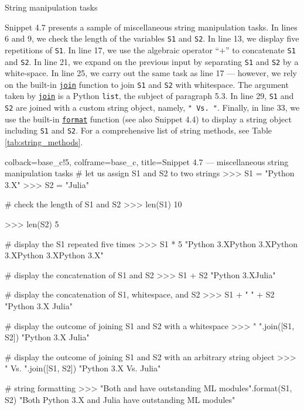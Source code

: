\documentclass[a4paper,11pt]{book}
\numberwithin{figure}{chapter}
\numberwithin{table}{chapter}
\newcommand{\question}[1]{%
    \begin{tcolorbox}[colback=comp_c!10,colframe=comp_c,sidebyside align=top,width=\linewidth,before skip=1ex]
        #1
    \end{tcolorbox}%
    \switchcolumn%
}
\newcommand{\note}[1]{%
    \begin{tcolorbox}[colback=white!0,colframe=white!10,width=\linewidth,before skip=1ex]
        #1
    \end{tcolorbox}         
}
\begin{document}
\begin{paracol}{2}
	\question{\raggedright String manipulation tasks}
		\note{Snippet 4.7 presents a sample of miscellaneous string manipulation tasks. In lines 6 and 9, we check the length of the variables \texttt{S1} and \texttt{S2}. In line 13, we display five repetitions of \texttt{S1}. In line 17, we use the algebraic operator ``$+$'' to concatenate \texttt{S1} and \texttt{S2}. In line 21, we expand on the previous input by separating \texttt{S1} and \texttt{S2} by a white-space. In line 25, we carry out the same task as line 17 --- however, we rely on the built-in \href{https://docs.python.org/3/library/stdtypes.html#str.join}{\texttt{join}} function to join \texttt{S1} and \texttt{S2} with whitespace. The argument taken by \href{https://docs.python.org/3/library/stdtypes.html#str.join}{\texttt{join}} is a Python \texttt{list}, the subject of paragraph 5.3. In line 29, \texttt{S1} and \texttt{S2} are joined with a custom string object, namely, \texttt{" Vs. "}. Finally, in line 33, we use the built-in \href{https://docs.python.org/3/library/stdtypes.html#str.format}{\texttt{format}} function (see also Snippet 4.4) to display a string object including \texttt{S1} and \texttt{S2}. For a comprehensive list of string methods, see Table \ref{tab:string_methods}.}
\end{paracol}
\clearpage

\begin{pythoncode}[linenos=true,]{colback=base_c!5, colframe=base_c, title=\sffamily Snippet 4.7 --- miscellaneous string manipulation tasks}
# let us assign S1 and S2 to two strings
>>> S1 = "Python 3.X"
>>> S2 = "Julia"

# check the length of S1 and S2
>>> len(S1)
10

>>> len(S2)
5

# display the S1 repeated five times
>>> S1 * 5
"Python 3.XPython 3.XPython 3.XPython 3.XPython 3.X"

# display the concatenation of S1 and S2
>>> S1 + S2
"Python 3.XJulia"

# display the concatenation of S1, whitespace, and S2
>>> S1 + " " + S2
"Python 3.X Julia"

# display the outcome of joining S1 and S2 with a whitespace
>>> " ".join([S1, S2])
"Python 3.X Julia"

# display the outcome of joining S1 and S2 with an arbitrary string object
>>> " Vs. ".join([S1, S2])
"Python 3.X Vs. Julia"

# string formatting
>>> "Both {} and {} have outstanding ML modules".format(S1, S2) 
"Both Python 3.X and Julia have outstanding ML modules"
\end{pythoncode}
\clearpage
\end{document}
